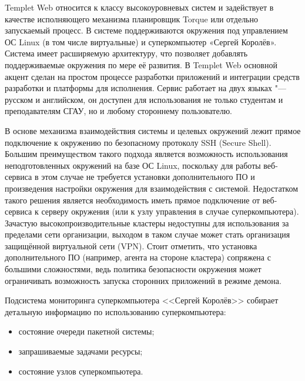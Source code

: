Templet Web относится к классу высокоуровневых систем и задействует в качестве исполняющего механизма планировщик Torque или отдельно запускаемый процесс. В системе поддерживаются окружения под управлением ОС Linux (в том числе виртуальные) и суперкомпьютер «Сергей Королёв». Система имеет расширяемую архитектуру, что позволяет добавлять поддерживаемые окружения по мере её развития.  В Templet Web основной акцент сделан на простом процессе разработки приложений и интеграции средств разработки и платформы для исполнения. Сервис работает на двух языках "--- русском и английском, он доступен для использования не только студентам и преподавателям СГАУ, но и любому стороннему пользователю.



В основе механизма взаимодействия системы и целевых окружений лежит прямое подключение к окружению по безопасному протоколу SSH (Secure Shell). Большим преимуществом такого подхода является возможность использования неподготовленных окружений на базе ОС Linux, поскольку для работы веб-сервиса в этом случае не требуется установки дополнительного ПО и произведения настройки окружения для взаимодействия с системой. Недостатком такого решения является необходимость иметь прямое подключение от веб-сервиса к серверу окружения (или к узлу управления в случае суперкомпьютера). Зачастую высокопроизводительные кластеры недоступны для использования за пределами сети организации, выходом в таком случае может стать организация защищённой виртуальной сети (VPN). Стоит отметить, что установка дополнительного ПО (например, агента на стороне кластера) сопряжена с большими сложностями, ведь политика безопасности окружения может ограничивать возможность запуска сторонних приложений в режиме демона.



Подсистема мониторинга суперкомпьютера <<Сергей Королёв>> собирает детальную информацию по использованию суперкомпьютера:

\begin{itemize}

\item состояние очереди пакетной системы;

\item запрашиваемые задачами ресурсы;

\item состояние узлов суперкомпьютера.

\end{itemize}



